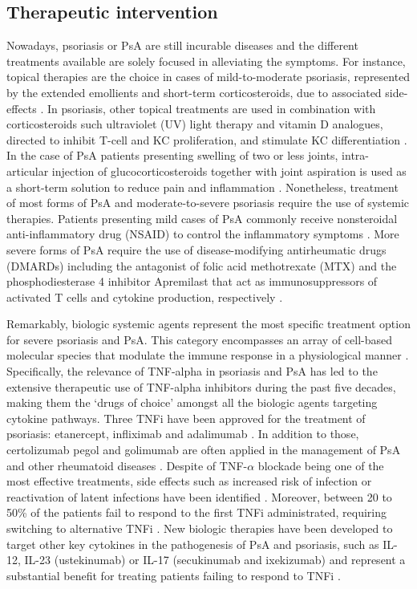 \subsection{Therapeutic intervention}
Nowadays, psoriasis or PsA are still incurable diseases and the different treatments available are solely focused in alleviating the symptoms. For instance, topical therapies are the choice in cases of mild-to-moderate psoriasis, represented by the extended emollients and short-term corticosteroids, due to associated side-effects \parencite{Menter2009}. In psoriasis, other topical treatments are used in combination with corticosteroids such ultraviolet (UV) light therapy and vitamin D analogues, directed to inhibit T-cell and KC proliferation, and stimulate KC differentiation \parencite{Rizova2001}. In the case of PsA patients presenting swelling of two or less joints, intra-articular injection of glucocorticosteroids together with joint aspiration is used as a short-term solution to reduce pain and inflammation \parencite{Coates2016}. Nonetheless, treatment of most forms of PsA and moderate-to-severe psoriasis require the use of systemic therapies. Patients presenting mild cases of PsA commonly receive nonsteroidal anti-inflammatory drug (NSAID) to control the inflammatory symptoms \parencite{Coates2016}. More severe forms of PsA require the use of disease-modifying antirheumatic drugs (DMARDs) including the antagonist of folic acid methotrexate (MTX) and the phosphodiesterase 4 inhibitor Apremilast that act as immunosuppressors of activated T cells and cytokine production, respectively \parencite{Schmitt2014, Gossec2016, Keating2017,Polachek2017}.

Remarkably, biologic systemic agents represent the most specific treatment option for severe psoriasis and PsA. This category encompasses an array of cell-based molecular species that modulate the immune response in a physiological manner \parencite{Perera2012}. Specifically, the relevance of TNF-alpha in psoriasis and PsA has led to the extensive therapeutic use of TNF-alpha inhibitors during the past five decades, making them the ‘drugs of choice’ amongst all the biologic agents targeting cytokine pathways. Three TNFi have been approved for the treatment of psoriasis: etanercept, infliximab and adalimumab \parencite{Ahil2016}. In addition to those, certolizumab pegol and golimumab are often applied in the management of PsA and other rheumatoid diseases \parencite{Coates2016b}. Despite of TNF-$\alpha$ blockade being one of the most effective treatments, side effects such as increased risk of infection or reactivation of latent infections have been identified \parencite{Nickoloff2004}. Moreover, between 20 to 50\% of the patients fail to respond to the first TNFi administrated, requiring switching to alternative TNFi \parencite{Abramson2016}. New biologic therapies have been developed to target other key cytokines in the pathogenesis of PsA and psoriasis, such as IL-12, IL-23 (ustekinumab) or IL-17 (secukinumab and ixekizumab) and represent a substantial benefit for treating patients failing to respond to TNFi \parencite{Mahil2016, Coates2016b}.

